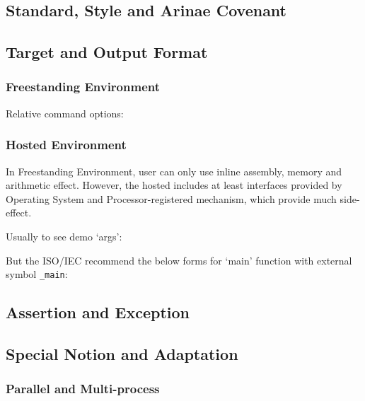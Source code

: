 \subsection{Standard, Style and Arinae Covenant}


\subsection{Target and Output Format}

\subsubsection{Freestanding Environment}

Relative command options: %

\subsubsection{Hosted Environment}

In Freestanding Environment, user can only use inline assembly, memory and arithmetic effect. However, the hosted includes at least interfaces provided by Operating System and Processor-registered mechanism, which provide much side-effect.

Usually to see demo `args':

\lstset{style=GlobalC}


But the ISO/IEC recommend the below forms for `main' function with external symbol \verb`_main`:


\subsection{Assertion and Exception}

\subsection{Special Notion and Adaptation}

\subsubsection{Parallel and Multi-process}

